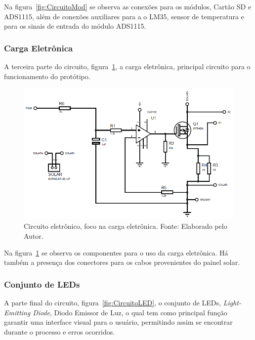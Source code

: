 Na figura~\ref{fig:CircuitoMod} se observa as conexões para os módulos, Cartão SD e ADS1115, além de conexões auxiliares para a o LM35, sensor de temperatura e para os sinais de entrada do módulo ADS1115.

\subsubsection{Carga Eletrônica}

A terceira parte do circuito,  figura~\ref{fig:CircuitoElet}, a carga eletrônica, principal circuito para o funcionamento do protótipo.

\begin{figure}[!htbp]
	\centering
	\includegraphics[scale=0.7]{imagens/CircuitoElet.png}
	\caption{Circuito eletrônico, foco na carga eletrônica. Fonte: Elaborado pelo Autor. 	}
	\label{fig:CircuitoElet}
\end{figure}
\FloatBarrier

Na figura~\ref{fig:CircuitoElet} se observa os componentes para o uso da carga eletrônica. Há também a presença dos conectores para os cabos provenientes do painel solar.

\subsubsection{Conjunto de LEDs}

A parte final do circuito,  figura~\ref{fig:CircuitoLED}, o conjunto de LEDs, \textit{Light-Emitting Diode}, Diodo Emissor de Luz, o qual tem como principal função garantir uma interface visual para o usuário, permitindo assim se encontrar durante o processo e erros ocorridos.

